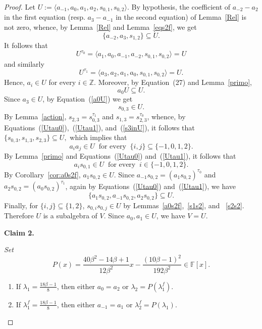 \documentclass[a4paper]{amsart}
\newcommand{\F}{{\mathbb F}}
\newcommand{\Z}{{\mathbb Z}}
\newcommand{\lmu}{\lambda_1}
\newcommand{\lmf}{\lambda_1^f}
\newcommand{\lmd}{\lambda_2}
\newcommand{\lmdf}{\lambda_2^f}
\newcommand{\bt}{\beta}
\begin{document}
\begin{proof}
Let $U:=\langle a_{-1}, a_0, a_1, a_2, s_{0,1}, s_{0,2} \rangle$. 
By hypothesis, the coefficient of $a_{-2}-a_2$  in the first equation (resp. $a_{3}-a_{-1}$  in the second equation) of Lemma~\ref{Rel} is not zero, whence, by Lemma~\ref{Rel} and Lemma~\ref{eqs2f}, we get 
\begin{equation}
\{a_{-2}, a_3, s_{1,2}\} \subseteq  U.
\end{equation} 
It follows that 
\begin{equation}\label{Utau0}
U^{\tau_0}=\langle a_{1}, a_{0}, a_{-1}, a_{-2}, s_{0,1}, s_{0,2} \rangle=U
\end{equation}
 and 
similarly 
\begin{equation}\label{Utau1}
U^{\tau_1}=\langle a_{3}, a_{2}, a_{1},a_{0}, s_{0,1}, s_{0,2} \rangle=U.
\end{equation}
Hence, $a_i\in U$ for every $i\in \Z$. Moreover, by Equation~(27) and Lemma~\ref{primo},
\begin{equation}\label{a0U}
a_0U\subseteq U.
\end{equation}
Since $a_3\in U$, by Equation~(\ref{a0U}) we get 
\begin{equation}\label{s3inU}
s_{0,3}\in U.
\end{equation}
By Lemma~\ref{action}, $s_{2,3}=s_{0,3}^{\tau_1}$ and $s_{1,3}=s_{2,3}^{\tau_0}$, whence, by Equations~(\ref{Utau0}),~(\ref{Utau1}), and~(\ref{s3inU}), it follows that 
$\{s_{0,3} , s_{1,3}, s_{2,3}\}\subseteq U,
$
which implies that  
$$a_ia_j\in U \:\mbox{ for every }\: \{i,j\}\subseteq \{-1, 0, 1, 2\}.
$$ 
By Lemma~\ref{primo} and Equations~(\ref{Utau0}) and~(\ref{Utau1}), it follows that 
$$
a_is_{0,1}\in U\: \mbox{ for every } \:i\in \{-1, 0, 1, 2\}.
$$
 By Corollary~\ref{cor:a0s2f}, $a_1s_{0,2}\in U$. Since $a_{-1}s_{0,2}=(a_1s_{0,2})^{\tau_0}$ and $a_{2}s_{0,2}=(a_0s_{0,2})^{\tau_1}$, again by Equations~(\ref{Utau0}) and~(\ref{Utau1}),  we have 
 $$
 \{a_1s_{0,2}, a_{-1}s_{0,2}, a_{2}s_{0,2} \}\subseteq U.
 $$
  Finally, for $\{i,j\}\subseteq \{1, 2\}$, $s_{0,i}s_{0,j}\in U $ by Lemmas~\ref{a0s2f},~\ref{s1s2}, and ~\ref{s2s2}. Therefore $U$ is a subalgebra of $V$. Since $a_0, a_1\in U$, we have $V=U$.
\medskip

{\bf Claim 2.} {\it
Set 
$$
P(x)=\frac{40\bt^2-14\bt+1}{12\bt^2}x-\frac{(10\bt-1)^2}{192\bt^2}\in \F[x].
$$
\begin{enumerate}
\item If $\lmu= \frac{18\bt-1}{8}$, then either $a_{0}=a_2$ or 
$
\lmd=P(\lmf).
$
\item If $\lmf= \frac{18\bt-1}{8}$, then either $a_{-1}=a_1$ or 
$
\lmdf=P(\lmu).
$
\end{enumerate}}
\medskip


\end{proof}
\end{document}
